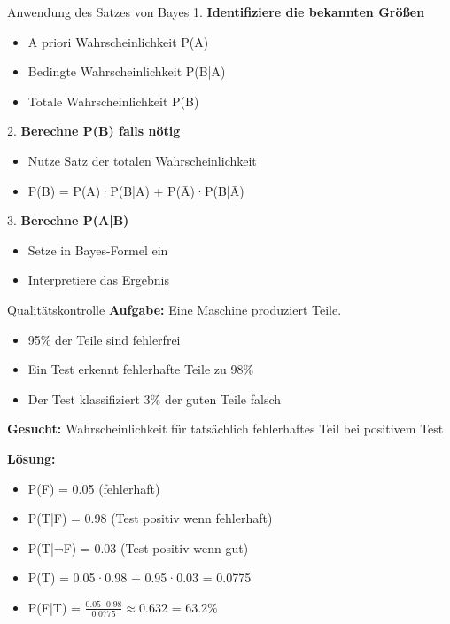 \begin{KR}{Anwendung des Satzes von Bayes}
1. \textbf{Identifiziere die bekannten Größen}
   \begin{itemize}
   \item A priori Wahrscheinlichkeit P(A)
   \item Bedingte Wahrscheinlichkeit P(B|A)
   \item Totale Wahrscheinlichkeit P(B)
   \end{itemize}

2. \textbf{Berechne P(B) falls nötig}
   \begin{itemize}
   \item Nutze Satz der totalen Wahrscheinlichkeit
   \item P(B) = P(A)·P(B|A) + P(Ā)·P(B|Ā)
   \end{itemize}

3. \textbf{Berechne P(A|B)}
   \begin{itemize}
   \item Setze in Bayes-Formel ein
   \item Interpretiere das Ergebnis
   \end{itemize}
\end{KR}

\begin{example}{Qualitätskontrolle}
\textbf{Aufgabe:} Eine Maschine produziert Teile. 
\begin{itemize}
\item 95\% der Teile sind fehlerfrei
\item Ein Test erkennt fehlerhafte Teile zu 98\%
\item Der Test klassifiziert 3\% der guten Teile falsch
\end{itemize}

\textbf{Gesucht:} Wahrscheinlichkeit für tatsächlich fehlerhaftes Teil bei positivem Test

\textbf{Lösung:}
\begin{itemize}
\item P(F) = 0.05 (fehlerhaft)
\item P(T|F) = 0.98 (Test positiv wenn fehlerhaft)
\item P(T|¬F) = 0.03 (Test positiv wenn gut)
\item P(T) = 0.05·0.98 + 0.95·0.03 = 0.0775
\item P(F|T) = $\frac{0.05 \cdot 0.98}{0.0775} \approx 0.632$ = 63.2\%
\end{itemize}
\end{example}

